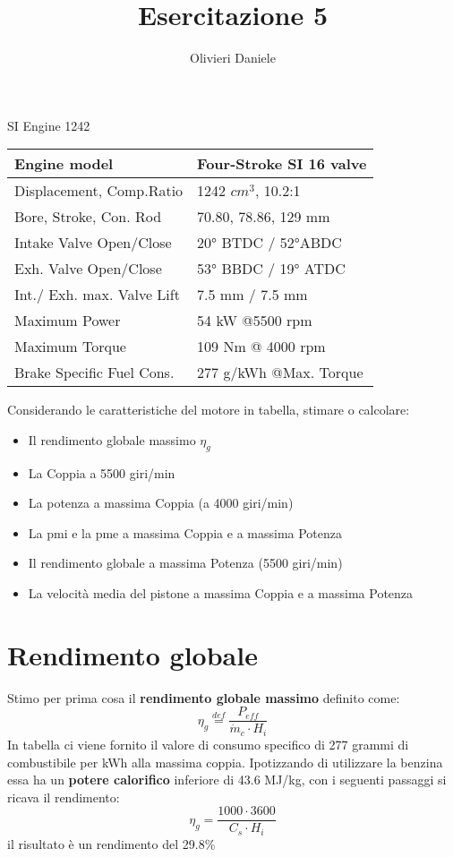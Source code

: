 \documentclass[a4paper,12pt]{article}
\title{Esercitazione 5}
\author{Olivieri Daniele}
\date{}
\begin{document}
\maketitle
\begin{center}
    SI Engine 1242 \\
    \begin{tabular}{|l | l|}
        \hline
        Engine model    &Four-Stroke SI 16 valve \\ \hline
        Displacement, Comp.Ratio &  1242 $cm^3$, 10.2:1 \\ \hline
        Bore, Stroke, Con. Rod & 70.80, 78.86, 129 mm \\ \hline
        Intake Valve Open/Close & 20° BTDC / 52°ABDC \\ \hline
        Exh. Valve Open/Close & 53° BBDC / 19° ATDC \\ \hline
        Int./ Exh. max. Valve Lift & 7.5 mm / 7.5 mm \\ \hline
        Maximum Power & 54 kW @5500 rpm \\ \hline
        Maximum Torque & 109 Nm @ 4000 rpm \\ \hline
        Brake Specific Fuel Cons. & 277 g/kWh @Max. Torque \\ \hline        
    \end{tabular}
\end{center}
Considerando le caratteristiche del motore in tabella, stimare o calcolare:
\begin{itemize}
    \item Il rendimento globale massimo $\eta_g$
    \item La Coppia a 5500 giri/min
    \item La potenza a massima Coppia (a 4000 giri/min)
    \item La pmi e la pme a massima Coppia e a massima Potenza
    \item Il rendimento globale a massima Potenza (5500 giri/min)
    \item La velocità media del pistone a massima Coppia e a massima Potenza
\end{itemize}
\section{Rendimento globale}
\label{sec:rendimento_globale}
Stimo per prima cosa il \textbf{rendimento globale massimo} definito come:
\begin{equation}
    \label{eq:rendimento_globale}
    \eta_g \stackrel{def}{=} \frac{P_{eff}}{\dot m_c \cdot H_i}
\end{equation}
In tabella ci viene fornito il valore di consumo specifico di 277 grammi di combustibile per kWh alla massima coppia.
Ipotizzando di utilizzare la benzina essa ha un \textbf{potere calorifico} inferiore di 43.6 MJ/kg, con i seguenti passaggi si ricava il rendimento:
\begin{equation*}
    \eta_g = \frac{1000\cdot3600}{C_s \cdot H_i}
\end{equation*}
il risultato è un rendimento del 29.8\%
\end{document}

